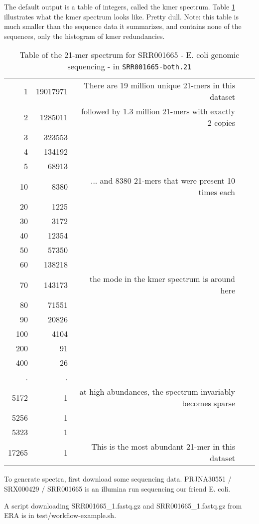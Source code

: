 \documentclass[11pt,fullpage]{article}
\begin{document}
The default output is a table of
integers, called the kmer spectrum.  Table \ref{kmerspectrum} illustrates what the kmer spectrum
looks like.  Pretty dull.   Note: this table is much smaller than the sequence data it summarizes,
and contains none of the sequences, only the histogram of kmer redundancies.

\begin{table}
\begin{tabular}{rrrrr}
1 & 19017971 & There are 19 million unique 21-mers in this dataset \\
2 & 1285011  & followed by 1.3 million 21-mers with exactly 2 copies \\
3 & 323553  \\
4 & 134192  \\
5 & 68913  \\
10 & 8380  & ... and 8380 21-mers that were present 10 times each \\
20 & 1225  \\
30 & 3172  \\
40 & 12354  \\
50 & 57350  \\
60 & 138218 & \\
70 & 143173 & the mode in the kmer spectrum is around here \\
80 & 71551  \\
90 & 20826  \\
100 & 4104  \\
200 & 91  \\
400 & 26  \\
. & . \\
5172 & 1 & at high abundances, the spectrum invariably becomes sparse \\
5256 & 1  \\
5323 & 1  \\
17265 & 1 &  This is the most abundant 21-mer in this dataset \\
\end{tabular}
\caption{Table of the 21-mer spectrum for SRR001665 - E. coli genomic sequencing - in \texttt{SRR001665-both.21} }
\label{kmerspectrum}
\end{table}

To generate spectra, first download some sequencing data.
PRJNA30551 / SRX000429 / SRR001665  is an illumina run sequencing our friend E. coli.

A script downloading SRR001665\_1.fastq.gz and SRR001665\_1.fastq.gz from ERA is in test/workflow-example.sh.
\end{document}
